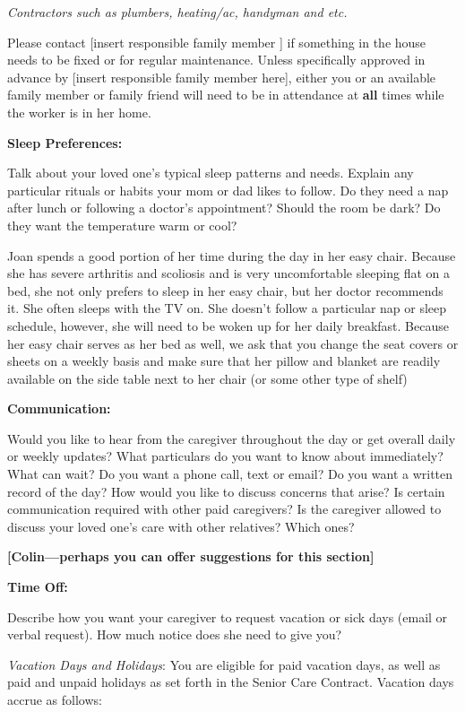 \documentclass[]{article}
\begin{document}
\emph{Contractors such as plumbers, heating/ac, handyman and etc.}

Please contact {[}insert responsible family member {]} if something in
the house needs to be fixed or for regular maintenance. Unless
specifically approved in advance by {[}insert responsible family member
here{]}, either you or an available family member or family friend will
need to be in attendance at \textbf{all} times while the worker is in
her home.

\textbf{Sleep Preferences:}

Talk about your loved one's typical sleep patterns and needs. Explain
any particular rituals or habits your mom or dad likes to follow. Do
they need a nap after lunch or following a doctor's appointment? Should
the room be dark? Do they want the temperature warm or cool?

Joan spends a good portion of her time during the day in her easy chair.
Because she has severe arthritis and scoliosis and is very uncomfortable
sleeping flat on a bed, she not only prefers to sleep in her easy chair,
but her doctor recommends it. She often sleeps with the TV on. She
doesn't follow a particular nap or sleep schedule, however, she will
need to be woken up for her daily breakfast. Because her easy chair
serves as her bed as well, we ask that you change the seat covers or
sheets on a weekly basis and make sure that her pillow and blanket are
readily available on the side table next to her chair (or some other
type of shelf)

\textbf{Communication:}

Would you like to hear from the caregiver throughout the day or get
overall daily or weekly updates? What particulars do you want to know
about immediately? What can wait? Do you want a phone call, text or
email? Do you want a written record of the day? How would you like to
discuss concerns that arise? Is certain communication required with
other paid caregivers? Is the caregiver allowed to discuss your loved
one's care with other relatives? Which ones?

\textbf{{[}Colin---perhaps you can offer suggestions for this
section{]}}

\textbf{Time Off:}

Describe how you want your caregiver to request vacation or sick days
(email or verbal request). How much notice does she need to give you?

\emph{Vacation Days and Holidays}: You are eligible for paid vacation
days, as well as paid and unpaid holidays as set forth in the Senior
Care Contract. Vacation days accrue as follows:
\end{document}
